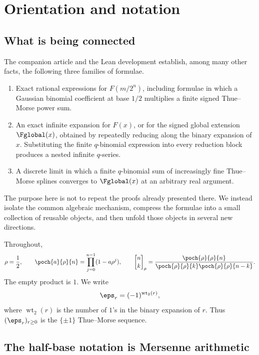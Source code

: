 \documentclass[11pt,oneside]{article}
\theoremstyle{definition}
\theoremstyle{remark}
\newcommand{\wt}{\operatorname{wt}_2}
\newcommand{\qbinom}[3]{\genfrac{[}{]}{0pt}{}{#1}{#2}_{#3}}
\begin{document}
\section{Orientation and notation}

\subsection{What is being connected}

The companion article and the Lean development establish, among many other
facts, the following three families of formulae.

\begin{enumerate}
\item Exact rational expressions for $F(m/2^n)$, including formulae in which a
  Gaussian binomial coefficient at base $1/2$ multiplies a finite signed
  Thue--Morse power sum.
\item An exact infinite expansion for $F(x)$, or for the signed
  global extension $\Fglobal(x)$, obtained by repeatedly reducing along the
  binary expansion of $x$.  Substituting the finite $q$-binomial expression
  into every reduction block produces a nested infinite $q$-series.
\item A discrete limit in which a finite $q$-binomial sum of increasingly fine
  Thue--Morse splines converges to $\Fglobal(x)$ at an arbitrary real argument.
\end{enumerate}

The purpose here is not to repeat the proofs already presented there.  We
instead isolate the common algebraic mechanism, compress the formulae into a
small collection of reusable objects, and then unfold those objects in several
new directions.

Throughout,
\[
  \rho=\frac12,
  \qquad
  \poch{a}{\rho}{n}=\prod_{j=0}^{n-1}(1-a\rho^j),
  \qquad
  \qbinom{n}{k}{\rho}
  =\frac{\poch{\rho}{\rho}{n}}
  {\poch{\rho}{\rho}{k}\poch{\rho}{\rho}{n-k}}.
\]
The empty product is $1$.  We write
\[
  \eps_r=(-1)^{\wt(r)},
\]
where $\wt(r)$ is the number of $1$'s in the binary expansion of $r$.
Thus $(\eps_r)_{r\ge0}$ is the $\{\pm1\}$ Thue--Morse sequence.


\subsection{The half-base notation is Mersenne arithmetic}
\end{document}
